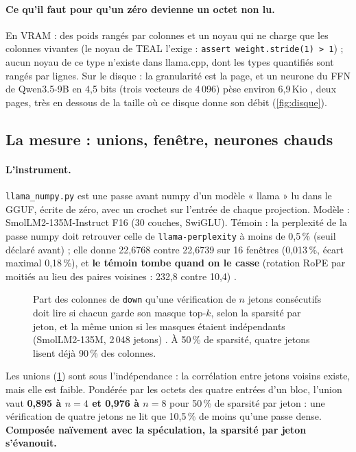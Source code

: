 \paragraph{Ce qu'il faut pour qu'un zéro devienne un octet non lu.} En VRAM : des poids rangés par colonnes et un noyau qui ne charge que les colonnes vivantes (le noyau de TEAL l'exige : \texttt{assert weight.stride(1) > 1}) ; aucun noyau de ce type n'existe dans llama.cpp, dont les types quantifiés sont rangés par lignes. Sur le disque : la granularité est la page, et un neurone du FFN de Qwen3.5-9B en 4,5 bits (trois vecteurs de 4\,096) pèse environ 6,9\,Kio \calc, deux pages, très en dessous de la taille où ce disque donne son débit (\cref{fig:disque}).

\subsection{La mesure : unions, fenêtre, neurones chauds}

\paragraph{L'instrument.} \texttt{llama\_numpy.py} est une passe avant numpy d'un modèle « llama » lu dans le GGUF, écrite de zéro, avec un crochet sur l'entrée de chaque projection. Modèle : SmolLM2-135M-Instruct F16 (30 couches, SwiGLU). Témoin : la perplexité de la passe numpy doit retrouver celle de \texttt{llama-perplexity} à moins de 0,5\,\% (seuil déclaré avant) ; elle donne 22,6768 contre 22,6739 sur 16 fenêtres (0,013\,\%, écart maximal 0,18\,\%), et \textbf{le témoin tombe quand on le casse} (rotation RoPE par moitiés au lieu des paires voisines : 232,8 contre 10,4) \mes.

\begin{figure}[ht]
\centering
\GrapheUnions
\caption[L'union des masques de $n$ jetons consécutifs]{Part des colonnes de \texttt{down} qu'une vérification de $n$ jetons consécutifs doit lire si chacun garde son masque top-$k$, selon la sparsité par jeton, et la même union si les masques étaient indépendants (SmolLM2-135M, 2\,048 jetons) \mes. À 50\,\% de sparsité, quatre jetons lisent déjà 90\,\% des colonnes.}
\label{fig:unions}
\end{figure}

Les unions (\cref{fig:unions}) sont sous l'indépendance : la corrélation entre jetons voisins existe, mais elle est faible. Pondérée par les octets des quatre entrées d'un bloc, l'union vaut \textbf{0,895 à $n = 4$ et 0,976 à $n = 8$} pour 50\,\% de sparsité par jeton \calc : une vérification de quatre jetons ne lit que 10,5\,\% de moins qu'une passe dense. \textbf{Composée naïvement avec la spéculation, la sparsité par jeton s'évanouit.}


